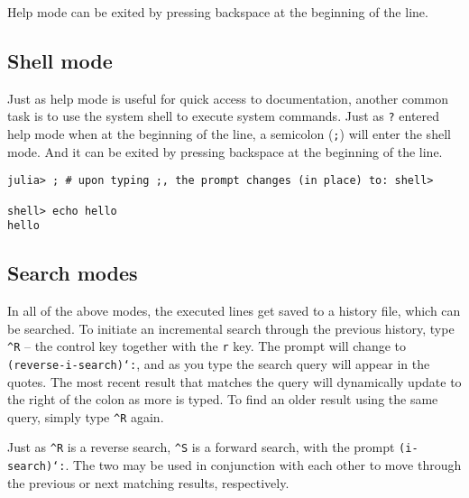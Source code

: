 Help mode can be exited by pressing backspace at the beginning of the line.



\hypertarget{17654100848947676892}{}


\subsection{Shell mode}



Just as help mode is useful for quick access to documentation, another common task is to use the system shell to execute system commands. Just as \texttt{?} entered help mode when at the beginning of the line, a semicolon (\texttt{;}) will enter the shell mode. And it can be exited by pressing backspace at the beginning of the line.




\begin{verbatim}
julia> ; # upon typing ;, the prompt changes (in place) to: shell>

shell> echo hello
hello
\end{verbatim}



\hypertarget{13961930499248375782}{}


\subsection{Search modes}



In all of the above modes, the executed lines get saved to a history file, which can be searched.  To initiate an incremental search through the previous history, type \texttt{{\textasciicircum}R} – the control key together with the \texttt{r} key. The prompt will change to \texttt{(reverse-i-search)`{\textquotesingle}:}, and as you type the search query will appear in the quotes. The most recent result that matches the query will dynamically update to the right of the colon as more is typed. To find an older result using the same query, simply type \texttt{{\textasciicircum}R} again.



Just as \texttt{{\textasciicircum}R} is a reverse search, \texttt{{\textasciicircum}S} is a forward search, with the prompt \texttt{(i-search)`{\textquotesingle}:}.  The two may be used in conjunction with each other to move through the previous or next matching results, respectively.



